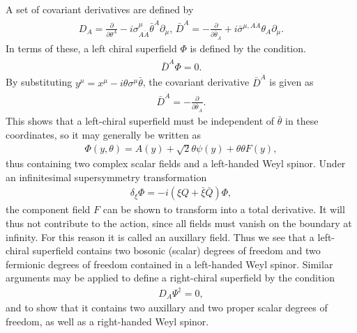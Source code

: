 \documentclass[twoside,english]{uiofysmaster}
\begin{document}
 A set of covariant derivatives are defined by
\begin{align}
	D_A = \frac{\partial}{\partial \theta^A} - i\sigma^\mu_{A \dot A}\bar\theta^{\dot A}\partial_\mu, \, \bar D^{\dot A} = -\frac{\partial}{\partial \bar \theta_{\dot A}} + i\bar\sigma^{\mu,A \dot A}\theta_A \partial_\mu.
\end{align}
In terms of these, a left chiral superfield $\Phi$ is defined by the condition.
\begin{align}
	\bar D^{\dot A} \Phi = 0.
\end{align}
By substituting $y^\mu = x^\mu - i\theta\sigma^\mu \bar \theta$, the covariant derivative $\bar D^{\dot A}$ is given as
\begin{align}
	\bar D^{\dot A} = -\frac{\partial}{\partial \bar\theta_{\dot A}}.
\end{align}
This shows that a left-chiral superfield must be independent of $\bar \theta$ in these coordinates, so it may generally be written as
\begin{align}
	\Phi(y, \theta) = A(y) + \sqrt{2}\theta\psi(y) + \theta\theta F(y), 
\end{align}
thus containing two complex scalar fields and a left-handed Weyl spinor. Under an infinitesimal supersymmetry transformation
\begin{align}
	\delta_\xi \Phi = -i(\xi Q + \bar\xi\bar Q)\Phi,
\end{align}
the component field $F$ can be shown to transform into a total derivative. It will thus not contribute to the action, since all fields must vanish on the boundary at infinity. For this reason it is called an auxillary field. Thus we see that a left-chiral superfield contains two bosonic (scalar) degrees of freedom and two fermionic degrees of freedom contained in a left-handed Weyl spinor. Similar arguments may be applied to define a right-chiral superfield by the condition
\begin{align}
	D_A \Psi^\dag = 0,
\end{align}
and to show that it contains two auxillary and two proper scalar degrees of freedom, as well as a right-handed Weyl spinor. 
\end{document}
